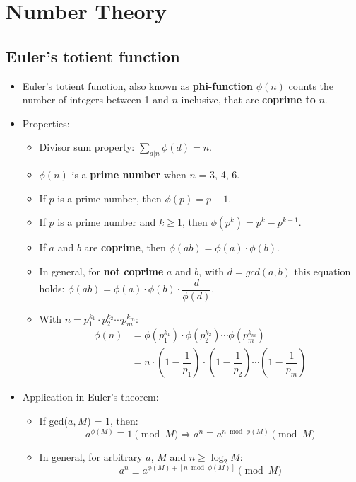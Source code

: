 \section{Number Theory}

\subsection{Euler's totient function}
\begin{itemize}
	\item Euler's totient function, also known as \textbf{phi-function} $\phi(n)$ 
	counts the number of integers between 1 and $n$ inclusive, that are
	\textbf{coprime to} $n$.
	\item Properties:
	\begin{itemize}
		\item Divisor sum property: $\sum\limits_{d | n} \phi(d) = n$.
		\item $\phi(n)$ is a \textbf{prime number} when $n$ = 3, 4, 6.
		\item If $p$ is a prime number, then $\phi(p) = p - 1$.
		\item If $p$ is a prime number and $k \geq 1$, then $\phi(p^k) = p^k - p^{k - 1}$.
		\item If $a$ and $b$ are \textbf{coprime}, then $\phi(ab) = \phi(a) \cdot \phi(b)$.
		\item In general, for \textbf{not coprime} $a$ and $b$, with $d = gcd(a, b)$ this equation holds: 
		$\phi(ab) = \phi(a) \cdot \phi(b) \cdot \dfrac{d}{\phi(d)}$.
		\item With $n = p_1^{k_1} \cdot p_2^{k_2} \cdots p_m^{k_m}$:
		\begin{align*}
			\phi(n) &= \phi(p_1^{k_1}) \cdot \phi(p_2^{k_2}) \cdots \phi(p_m^{k_m}) \\ 
			&= n \cdot \left(1 - \dfrac{1}{p_1}\right) \cdot \left(1 - \dfrac{1}{p_2}\right) \cdots \left(1 - \dfrac{1}{p_m}\right)
		\end{align*}
	\end{itemize}
	\item Application in Euler's theorem:
	\begin{itemize}
		\item If gcd($a, M$) = 1, then:
		\[ a^{\phi(M)} \equiv 1 \pmod M \Rightarrow a^{n} \equiv a^{n \bmod \phi(M)} \pmod M \]
		\item In general, for arbitrary $a$, $M$ and $n \geq \log_2{M}$:
		\[ a^{n} \equiv a^{\phi(M) + [n \bmod \phi(M)]} \pmod M \]
	\end{itemize}
\end{itemize}

